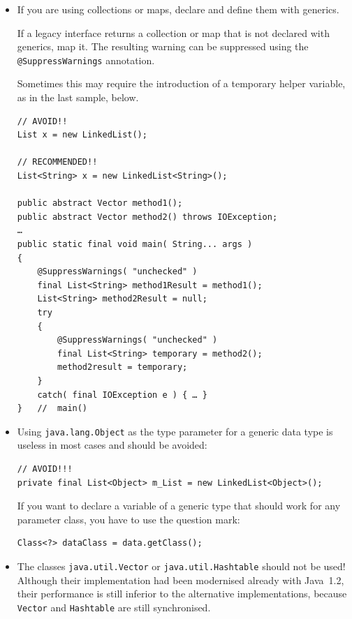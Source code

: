 \begin{itemize}
{In most cases, you can use a lambda instead of an anonymous class.}

\item{If you are using collections or maps, declare and define them with generics.

If a legacy interface returns a collection or map that is not declared with generics, map it. The resulting warning can be suppressed using the \lstinline|@SuppressWarnings|\autocite{ORACLE_DOC_SUPPRESSWARNINGS_ANNOTATION} annotation.

Sometimes this may require the introduction of a temporary helper variable, as in the last sample, below.

\begin{lstlisting}
// AVOID!!
List x = new LinkedList(); 

// RECOMMENDED!!
List<String> x = new LinkedList<String>(); 

public abstract Vector method1();
public abstract Vector method2() throws IOException;
…
public static final void main( String... args )
{
    @SuppressWarnings( "unchecked" )
    final List<String> method1Result = method1();
    List<String> method2Result = null;
    try
    {
        @SuppressWarnings( "unchecked" )
        final List<String> temporary = method2();
        method2result = temporary;
    }
    catch( final IOException e ) { … }
}   //  main()
\end{lstlisting}}

\item{Using \lstinline|java.lang.Object| as the type parameter for a generic data type is useless in most cases and should be avoided:
\begin{lstlisting}
// AVOID!!!
private final List<Object> m_List = new LinkedList<Object>();
\end{lstlisting}
If you want to declare a variable of a generic type that should work for any parameter class, you have to use the question mark:
\begin{lstlisting}
Class<?> dataClass = data.getClass();
\end{lstlisting}}

\item{The classes \lstinline|java.util.Vector|\autocite{ORACLE_DOC_VECTOR_CLASS} or \lstinline|java.util.Hashtable|\autocite{ORACLE_DOC_HASHTABLE_CLASS} should not be used! Although their implementation had been modernised already with Java~1.2, their performance is still inferior to the alternative implementations, because \lstinline|Vector| and \lstinline|Hashtable| are still synchronised.

}
\end{itemize}
